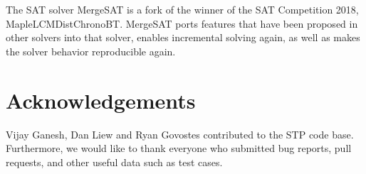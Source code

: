 \documentclass{easychair}
\begin{document}
The SAT solver MergeSAT is a fork of the winner of the SAT Competition 2018, MapleLCMDistChronoBT.
MergeSAT ports features that have been proposed in other solvers into that solver, enables incremental solving again, as well as makes the solver behavior reproducible again.

\section*{Acknowledgements}
Vijay Ganesh, Dan Liew and Ryan Govostes contributed to the STP code base.
Furthermore, we would like to thank everyone who submitted bug reports, pull requests, and other useful data such as test cases.




\vfill
\pagebreak
\end{document}
